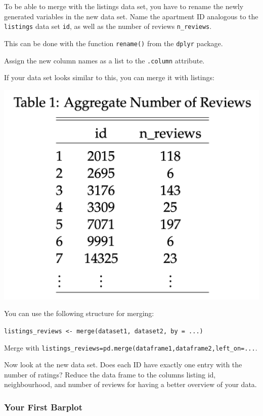 \documentclass[
  11pt,
]{article}
\newenvironment{tips}[1]
  {
  \begin{itemize}
  \footnotesize
  \renewcommand{\labelitemi}{
    \raisebox{-.7\height}[0pt][0pt]{
      {\setkeys{Gin}{width=3em,keepaspectratio}
        \texttt{[image: images/\#1.png]}}
    }
  }
  \setlength{\fboxsep}{1em}
  \begin{rbox}
  \item
  }
  {
  \end{rbox}
  \end{itemize}
  }
\newenvironment{tipsp}[1]
  {
  \begin{itemize}
  \footnotesize
  \renewcommand{\labelitemi}{
    \raisebox{-.7\height}[0pt][0pt]{
      {\setkeys{Gin}{width=3em,keepaspectratio}
        \texttt{[image: images/\#1.png]}}
    }
  }
  \setlength{\fboxsep}{1em}
  \begin{pbox}
  \item
  }
  {
  \end{pbox}
  \end{itemize}
  }
\begin{document}
To be able to merge with the listings data set, you have to rename the newly generated variables in the new data set. Name the apartment ID analogous to the \texttt{listings} data set \texttt{id}, as well as the number of reviews \texttt{n\_reviews}.

\begin{tips}r
This can be done with the function \texttt{rename()} from the \texttt{dplyr} package.

\end{tips}

\begin{tipsp}p
Assign the new column names as a list to the \texttt{.column} attribute.

\end{tipsp}

If your data set looks similar to this, you can merge it with listings:

\begin{center}\includegraphics[width=0.4\linewidth]{plot/2_merging_table} \end{center}

\begin{tips}r
You can use the following structure for merging:

\texttt{listings\_reviews\ \textless{}-\ merge(dataset1,\ dataset2,\ by\ =\ ...)}

\end{tips}

\begin{tipsp}p
Merge with \texttt{listings\_reviews=pd.merge(dataframe1,dataframe2,left\_on=...}.

\end{tipsp}

Now look at the new data set. Does each ID have exactly one entry with the number of ratings?
Reduce the data frame to the columns listing id, neighbourhood, and number of reviews for having a better overview of your data.

\hypertarget{your-first-barplot}{%
\subsubsection{Your First Barplot}\label{your-first-barplot}}
\end{document}
